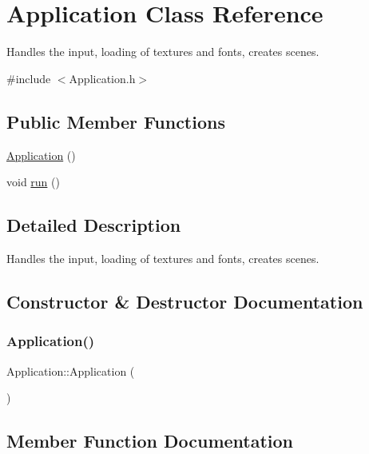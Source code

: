 \hypertarget{class_application}{}\section{Application Class Reference}
\label{class_application}


Handles the input, loading of textures and fonts, creates scenes.  




{\ttfamily \#include $<$Application.\+h$>$}

\subsection*{Public Member Functions}
\begin{DoxyCompactItemize}
\item 
\hyperlink{class_application_afa8cc05ce6b6092be5ecdfdae44e05f8}{Application} ()
\item 
void \hyperlink{class_application_a68965449404743bf1add056784d6cf81}{run} ()
\end{DoxyCompactItemize}


\subsection{Detailed Description}
Handles the input, loading of textures and fonts, creates scenes. 



\subsection{Constructor \& Destructor Documentation}
\mbox{\label{class_application_afa8cc05ce6b6092be5ecdfdae44e05f8}} 
\subsubsection{\texorpdfstring{Application()}{Application()}}
{\footnotesize\ttfamily Application\+::\+Application (\begin{DoxyParamCaption}{ }\end{DoxyParamCaption})}



\subsection{Member Function Documentation}
\mbox{\label{class_application_a68965449404743bf1add056784d6cf81}} 
